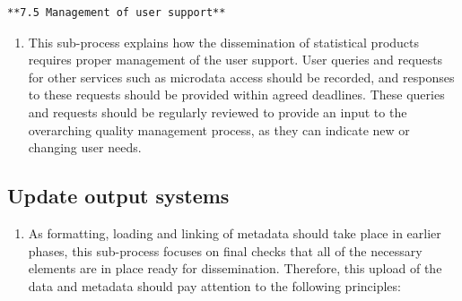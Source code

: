 \documentclass[
]{article}
\providecommand{\tightlist}{%
  \setlength{\itemsep}{0pt}\setlength{\parskip}{0pt}}
\begin{document}
\begin{verbatim}
**7.5 Management of user support**
\end{verbatim}

\begin{enumerate}
\def\labelenumi{\arabic{enumi}.}
\setcounter{enumi}{493}
\tightlist
\item
  This sub-process explains how the dissemination of statistical
  products requires proper management of the user support. User
  queries and requests for other services such as microdata access
  should be recorded, and responses to these requests should be
  provided within agreed deadlines. These queries and requests should
  be regularly reviewed to provide an input to the overarching quality
  management process, as they can indicate new or changing user needs.
\end{enumerate}

\hypertarget{update-output-systems}{%
\subsection{Update output systems}\label{update-output-systems}}

\begin{enumerate}
\def\labelenumi{\arabic{enumi}.}
\setcounter{enumi}{494}
\tightlist
\item
  As formatting, loading and linking of metadata should take place in
  earlier phases, this sub-process focuses on final checks that all of
  the necessary elements are in place ready for dissemination.
  Therefore, this upload of the data and metadata should pay attention
  to the following principles:
\end{enumerate}
\end{document}
